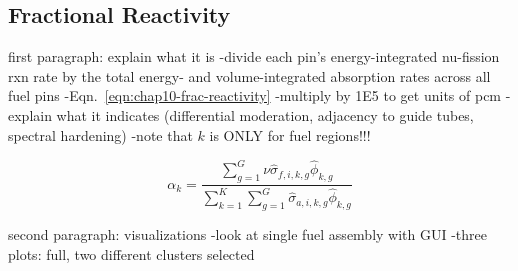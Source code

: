 \clearpage

\subsection{Fractional Reactivity}
\label{subsec:chap10-frac-reactivity}

first paragraph: explain what it is
-divide each pin's energy-integrated nu-fission rxn rate by the total energy- and volume-integrated absorption rates across all fuel pins
-Eqn.~\ref{eqn:chap10-frac-reactivity}
  -multiply by 1E5 to get units of \ac{pcm}
-explain what it indicates (differential moderation, adjacency to guide tubes, spectral hardening)
-note that $k$ is ONLY for fuel regions!!!

\begin{equation}
\label{eqn:chap10-frac-reactivity}
\alpha_{k} = \frac{\displaystyle\sum\limits_{g=1}^{G}\nu\hat{\sigma}_{f,i,k,g}\hat{\phi}_{k,g}}{\displaystyle\sum\limits_{k=1}^{K}\displaystyle\sum\limits_{g=1}^{G}\hat{\sigma}_{a,i,k,g}\hat{\phi}_{k,g}}
\end{equation}

second paragraph: visualizations
-look at single fuel assembly with GUI
-three plots: full, two different clusters selected

